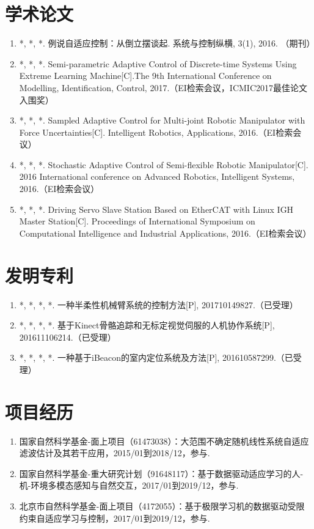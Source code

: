 
\begin{publications}{99}
\section*{学术论文}
\begin{enumerate}%
\item *, *, *. 例说自适应控制：从倒立摆谈起. 系统与控制纵横, 3(1), 2016. （期刊）
\item *, *, *. Semi-parametric Adaptive Control of Discrete-time Systems Using Extreme Learning Machine[C].The 9th International Conference on Modelling, Identification, Control, 2017.（EI检索会议，ICMIC2017最佳论文入围奖）
\item *, *, *. Sampled Adaptive Control for Multi-joint Robotic Manipulator with Force Uncertainties[C]. Intelligent Robotics, Applications, 2016.（EI检索会议）
\item *, *, *. Stochastic Adaptive Control of Semi-flexible Robotic Manipulator[C]. 2016 International conference on Advanced Robotics, Intelligent Systems, 2016.（EI检索会议）
\item *, *, *. Driving Servo Slave Station Based on EtherCAT with Linux IGH Master Station[C]. Proceedings of International Symposium on Computational Intelligence and Industrial Applications, 2016.（EI检索会议）
\end{enumerate}

\section*{发明专利}
\begin{enumerate}%
\item *, *, *, *. 一种半柔性机械臂系统的控制方法[P], 201710149827.（已受理）
\item *, *, *, *. 基于Kinect骨骼追踪和无标定视觉伺服的人机协作系统[P], 201611106214.（已受理）
\item *, *, *, *. 一种基于iBeacon的室内定位系统及方法[P], 201610587299.（已受理）
\end{enumerate}

\section*{项目经历}
\begin{enumerate}
\item 国家自然科学基金-面上项目（61473038）：大范围不确定随机线性系统自适应滤波估计及其若干应用，2015/01到2018/12，参与.
\item 国家自然科学基金-重大研究计划（91648117）：基于数据驱动适应学习的人-机-环境多模态感知与自然交互，2017/01到2019/12，参与.
\item 北京市自然科学基金-面上项目（4172055）：基于极限学习机的数据驱动受限约束自适应学习与控制，2017/01到2019/12，参与.
\end{enumerate}
\end{publications}

